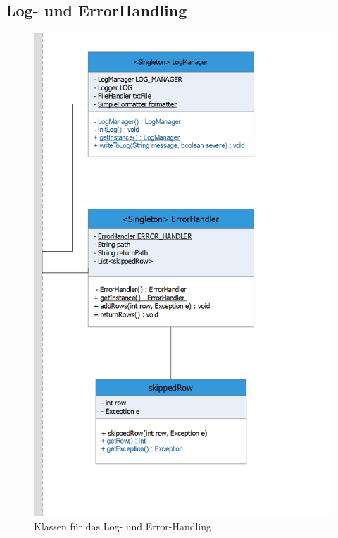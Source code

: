 \subsection{Log- und ErrorHandling}
\begin{figure}[!h]
\centering
\includegraphics[scale=0.6]{uml/screenshots/errors}
\caption{Klassen für das Log- und Error-Handling}
\end{figure}
\clearpage


\clearpage

\clearpage

\clearpage



